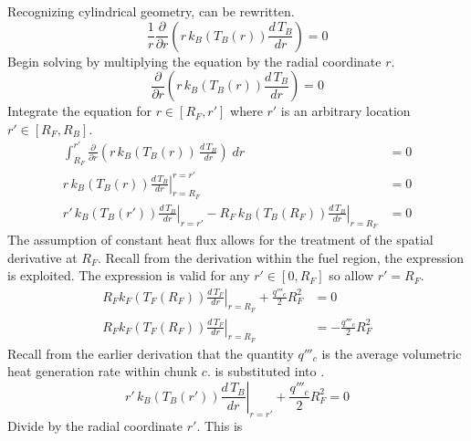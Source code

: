       Recognizing cylindrical geometry,  can be rewritten.
      \begin{equation}
        \label{eq:tb_heat_conduction}
        \frac{1}{r} \frac{\partial}{\partial r} \left(
          r \, k_B(T_B(r)) \frac{d \, T_B}{dr} \right) = 0
      \end{equation}
      Begin solving  by multiplying the equation by
      the radial coordinate $r$.
      \begin{equation}
        \frac{\partial}{\partial r} \left( r \, k_B(T_B(r)) \frac{d \, T_B}{dr}
          \right) = 0
      \end{equation}
      Integrate the equation for $r \in[R_F,r']$ where $r'$ is an arbitrary
      location $r' \in [R_F,R_B]$.
      \begin{align}
        \int_{R_F}^{r'} \frac{\partial}{\partial r} \left( r\, k_B(T_B(r)) \, 
          \frac{d\,T_B}{dr} \right) \; dr &= 0\\
        \left. r\, k_B(T_B(r)) \frac{d\,T_B}{dr} \right|_{r=R_F}^{r=r'} &= 0 \\
        \label{eq:tf_first_integral}
        \left. r' \, k_B(T_B(r')) \frac{d\,T_B}{dr} \right|_{r=r'} - 
          \left. R_F \, k_B(T_B(R_F)) \frac{d\,T_B}{dr} \right|_{r=R_F} &= 0
      \end{align}
      The assumption of constant heat flux allows for the treatment of the
      spatial derivative at $R_F$. Recall from the derivation within the fuel
      region, the expression  is exploited. The expression is
      valid for any $r' \in [0,R_F]$ so allow $r'=R_F$.
      \begin{align}
        \left. R_F k_F(T_F(R_F)) \frac{d\,T_F}{dr} \right|_{r=R_F} + 
          \frac{q'''_c}{2} R_F^2 &= 0 \\
        \label{eq:surface_relation}
        \left. R_F k_F(T_F(R_F)) \frac{d\,T_F}{dr} \right|_{r=R_F} &= 
          - \frac{q'''_c}{2} R_F^2
      \end{align}
      Recall from the earlier derivation that the quantity $q'''_c$ is the
      average volumetric heat generation rate within chunk $c$.
       is substituted into
      .
      \begin{equation}
        \label{eq:tf_first_bc}
        \left. r' \, k_B(T_B(r')) \frac{d\,T_B}{dr} \right|_{r=r'} +
          \frac{q'''_c}{2} R_F^2 = 0
      \end{equation}
      Divide  by the radial coordinate $r'$. This is
